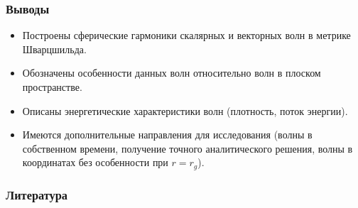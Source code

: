 \documentclass[compress, 9pt]{beamer}
\def\docroot{../..}
\begin{document}
    \begin{frame}\frametitle{Выводы}

        \begin{itemize}\justifying
            \item Построены сферические гармоники скалярных и векторных волн в метрике Шварцшильда.
            \item Обозначены особенности данных волн относительно волн в плоском пространстве.
            \item Описаны энергетические характеристики волн (плотность, поток энергии).
            \item Имеются дополнительные направления для исследования (волны в собственном времени, получение точного аналитического решения, волны в координатах без особенности при $r = r_g$).
        \end{itemize}

    \end{frame}

    \begin{frame}\frametitle{Литература}

        {\tiny{
        
        
        }}

    \end{frame}
\end{document}
